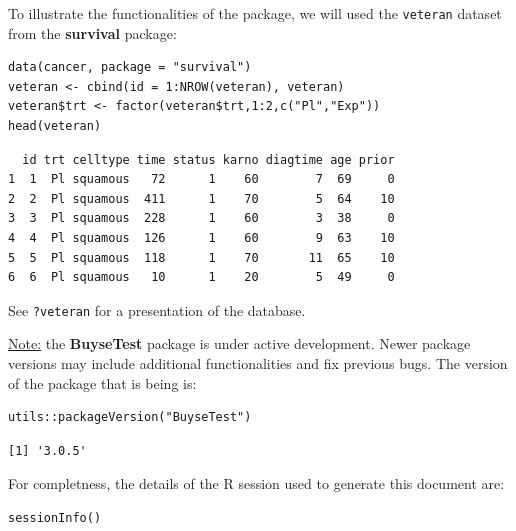 \documentclass[12pt]{article}
\begin{document}
To illustrate the functionalities of the package, we will used the
\texttt{veteran} dataset from the \textbf{survival} package:
\lstset{language=r,label= ,caption= ,captionpos=b,numbers=none}
\begin{lstlisting}
data(cancer, package = "survival")
veteran <- cbind(id = 1:NROW(veteran), veteran)
veteran$trt <- factor(veteran$trt,1:2,c("Pl","Exp"))
head(veteran)
\end{lstlisting}

\begin{verbatim}
  id trt celltype time status karno diagtime age prior
1  1  Pl squamous   72      1    60        7  69     0
2  2  Pl squamous  411      1    70        5  64    10
3  3  Pl squamous  228      1    60        3  38     0
4  4  Pl squamous  126      1    60        9  63    10
5  5  Pl squamous  118      1    70       11  65    10
6  6  Pl squamous   10      1    20        5  49     0
\end{verbatim}


See \texttt{?veteran} for a presentation of the database.

\bigskip

\uline{Note:} the \textbf{BuyseTest} package is under active development. Newer
package versions may include additional functionalities and fix
previous bugs. The version of the package that is being is:
\lstset{language=r,label= ,caption= ,captionpos=b,numbers=none}
\begin{lstlisting}
utils::packageVersion("BuyseTest")
\end{lstlisting}

\begin{verbatim}
[1] '3.0.5'
\end{verbatim}


For completness, the details of the R session used to generate this
document are:
\lstset{language=r,label= ,caption= ,captionpos=b,numbers=none}
\begin{lstlisting}
sessionInfo()
\end{lstlisting}
\end{document}
